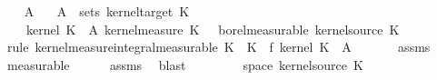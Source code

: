 \begin{isabellebody}
%
\isadelimproof
%
\endisadelimproof
%
\isatagproof
{}\isamarkupfalse%
\isanewline
\ \ \isamarkupfalse%
\ A{\isacharprime}{\kern0pt}\ \isamarkupfalse%
\ {\isacharasterisk}{\kern0pt}{\isacharcolon}{\kern0pt}\ {\isachardoublequoteopen}A{\isacharprime}{\kern0pt}\ {\isasymin}\ sets\ {\isacharparenleft}{\kern0pt}kernel{\isacharunderscore}{\kern0pt}target\ K\isanewline
\ \ \isamarkupfalse%
\ {\isachardoublequoteopen}{\isacharparenleft}{\kern0pt}{\isasymlambda}{\isasymomega}\ {\isasymintegral}\isactrlsup {\isacharplus}{\kern0pt}\ {\isasymomega}\ kernel\ K\ {\isasymomega}\ A{\isacharprime}{\kern0pt}\ {\isasympartial}kernel{\isacharunderscore}{\kern0pt}measure\ K\ {\isasymomega}\ {\isasymin}\ borel{\isacharunderscore}{\kern0pt}measurable\ {\isacharparenleft}{\kern0pt}kernel{\isacharunderscore}{\kern0pt}source\ K\isanewline
\ \ \ \ \isamarkupfalse%
\ {\isacharparenleft}{\kern0pt}rule\ kernel{\isacharunderscore}{\kern0pt}measure{\isacharunderscore}{\kern0pt}integral{\isacharunderscore}{\kern0pt}measurable{\isacharbrackleft}{\kern0pt}\ K\ {\isacharequal}{\kern0pt}\ {\isachardoublequoteopen}K\ \ f{\isacharequal}{\kern0pt}{\isachardoublequoteopen}{\isasymlambda}{\isasymomega}\ kernel\ K\ {\isasymomega}\ A{\isacharprime}{\kern0pt}{\isachardoublequoteclose}{\isacharbrackright}{\kern0pt}{\isacharparenright}{\kern0pt}\isanewline
\ \ \ \ \isamarkupfalse%
\ {\isacharasterisk}{\kern0pt}\ assms{\isacharparenleft}{\kern0pt}{}{\isacharparenright}{\kern0pt}\ \isamarkupfalse%
\ measurable\isanewline
\ \ \ \ \isamarkupfalse%
\ assms{\isacharparenleft}{\kern0pt}{}{\isacharparenright}{\kern0pt}\ \isamarkupfalse%
\ blast\isanewline
{}\isamarkupfalse%
\isanewline
\ \ \isamarkupfalse%
\ {\isasymomega}\ \isamarkupfalse%
\ {\isachardoublequoteopen}{\isasymomega}\ {\isasymin}\ space\ {\isacharparenleft}{\kern0pt}kernel{\isacharunderscore}{\kern0pt}source\ K\isanewline

\end{isabellebody}
